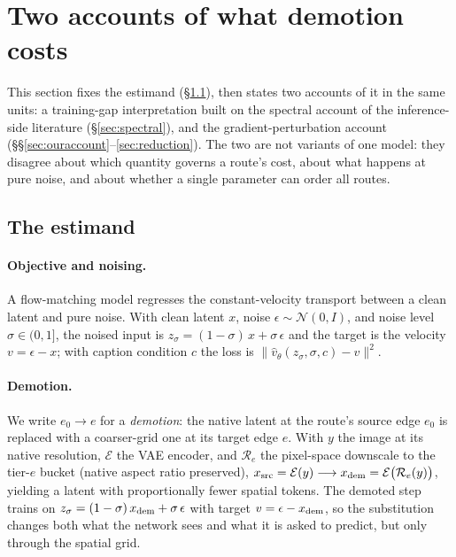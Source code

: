 \section{Two accounts of what demotion costs}
\label{sec:theory}

This section fixes the estimand (\S\ref{sec:estimand}), then states
two accounts of it in the same units: a training-gap interpretation
built on the spectral account of the inference-side literature
(\S\ref{sec:spectral}), and the gradient-perturbation account
(\S\S\ref{sec:ouraccount}--\ref{sec:reduction}). The two
are not variants of one model: they disagree about which quantity
governs a route's cost, about what happens at pure noise, and about
whether a single parameter can order all routes.

\subsection{The estimand}
\label{sec:estimand}

\paragraph{Objective and noising.}
A flow-matching model regresses the constant-velocity transport between
a clean latent and pure noise. With clean latent $x$, noise
$\epsilon \sim \mathcal{N}(0, I)$, and noise level $\sigma \in (0,1]$,
the noised input is $z_\sigma = (1-\sigma)\,x + \sigma\,\epsilon$ and
the target is the velocity $v = \epsilon - x$; with caption condition
$c$ the loss is $\|\hat v_\theta(z_\sigma, \sigma, c) - v\|^2$.

\paragraph{Demotion.}
We write $e_0 {\to} e$ for a \emph{demotion}: the native latent at the
route's source edge $e_0$ is replaced with a coarser-grid one at its
target edge $e$.
With $y$ the image at its native resolution, $\mathcal{E}$ the VAE
encoder, and $\mathcal{R}_e$ the pixel-space downscale to the tier-$e$
bucket (native aspect ratio preserved),
$x_{\mathrm{src}} = \mathcal{E}(y) \longrightarrow
x_{\mathrm{dem}} = \mathcal{E}\big(\mathcal{R}_{e}(y)\big)$, yielding a latent
with proportionally fewer spatial tokens. The demoted step trains on
$z_\sigma = (1-\sigma)\,x_{\mathrm{dem}} + \sigma\,\epsilon$ with target
$v = \epsilon - x_{\mathrm{dem}}$, so the substitution changes both what the
network sees and what it is asked to predict, but only through the
spatial grid.

